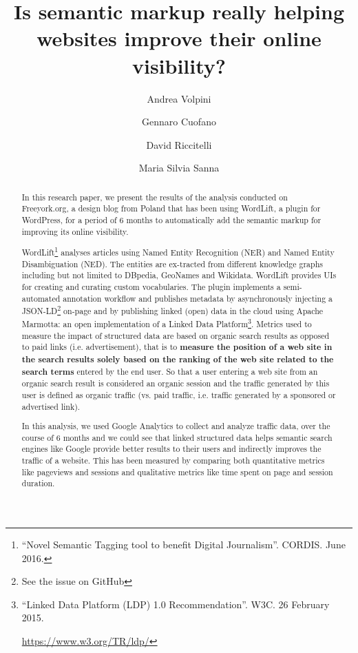 \documentclass[runningheads,a4paper]{llncs}
\begin{document}
\mainmatter

\title{Is semantic markup really helping websites improve their online
 visibility?}
\author{Andrea Volpini \and
Gennaro Cuofano \and
David Riccitelli \and
Maria Silvia Sanna}
\maketitle

\begin{abstract}
In this research paper, we present the results of the analysis conducted on Freeyork.org, a design blog from Poland that has been
 using WordLift, a plugin for WordPress, for a period of 6 months to
automatically add the semantic markup for improving its online
 visibility.

WordLift\footnote{``Novel Semantic Tagging tool to benefit Digital Journalism''. CORDIS. June 2016.
} analyses articles using Named Entity Recognition
 (NER) and Named Entity Disambiguation (NED). The entities are ex-tracted from different knowledge graphs including but not limited
 to DBpedia, GeoNames and Wikidata. WordLift provides UIs for
 creating and curating custom vocabularies. The plugin implements
 a semi-automated annotation workflow and publishes metadata by
 asynchronously injecting a JSON-LD\footnote{See the issue on GitHub} on-page and by publishing
 linked (open) data in the cloud using Apache Marmotta: an open implementation of a Linked Data Platform\footnote{``Linked Data Platform (LDP) 1.0 Recommendation''. W3C. 26 February 2015.

\url{https://www.w3.org/TR/ldp/}}. Metrics used to measure
 the impact of structured data are based on organic search results
 as opposed to paid links (i.e. advertisement), that is to {\bf measure the position of a web site in the search results solely based on the ranking of the web site related to the search terms}
 entered by the end user. So that a user entering a web site from
 an organic search result is considered an organic session and the
 traffic generated by this user is defined as organic traffic (vs. paid
 traffic, i.e. traffic generated by a sponsored or advertised link).

In this analysis, we used Google Analytics to collect and analyze
 traffic data, over the course of 6 months and we could see that
 linked structured data helps semantic search engines like Google
 provide better results to their users and indirectly improves the
 traffic of a website. This has been measured by comparing both
 quantitative metrics like pageviews and sessions and qualitative
 metrics like time spent on page and session duration.


\end{abstract}
\end{document}
